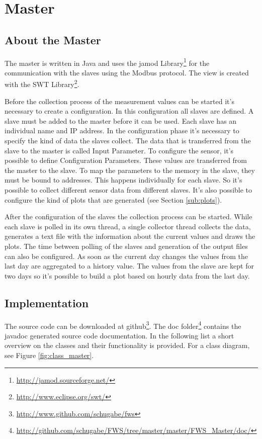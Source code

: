 
\chapter{Master}

\section{About the Master} %
\label{sec:about_the_master}
The master is written in Java and uses the jamod Library\footnote{\url{http://jamod.sourceforge.net/}} for the communication with the slaves using the Modbus protocol. The view is created with the SWT Library\footnote{\url{http://www.eclipse.org/swt/}}. 

Before the collection process of the measurement values can be started it's necessary to create a configuration. In this configuration all slaves are defined. A slave must be added to the master before it can be used. Each slave has an individual name and IP address. In the configuration phase it's necessary to specify the kind of data the slaves collect. The data that is transferred from the slave to the master is called Input Parameter. To configure the sensor, it's possible to define Configuration Parameters. These values are transferred from the master to the slave. To map the parameters to the memory in the slave, they must be bound to addresses. This happens individually for each slave. So it's possible to collect different sensor data from different slaves. It's also possible to configure the kind of plots that are generated (see Section \ref{sub:plots}).

After the configuration of the slaves the collection process can be started. While each slave is polled in its own thread, a single collector thread collects the data, generates a text file with the information about the current values and draws the plots. The time between polling of the slaves and generation of the output files can also be configured. As soon as the current day changes the values from the last day are aggregated to a history value. The values from the slave are kept for two days so it's possible to build a plot based on hourly data from the last day. 

\section{Implementation} %
\label{sec:implementation}
The source code can be downloaded at github\footnote{\url{http://www.github.com/schugabe/fws}}. The doc folder\footnote{\url{http://github.com/schugabe/FWS/tree/master/master/FWS_Master/doc/}} contains the javadoc generated source code documentation. In the following list a short overview on the classes and their functionality is provided. For a class diagram, see Figure \ref{fig:class_master}.

